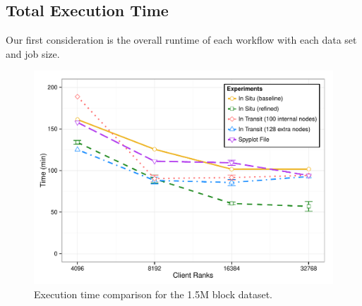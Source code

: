 

\subsection{Total Execution Time}
\label{sec:TotalExecutionTime}

Our first consideration is the overall runtime of each workflow with each
data set and job size.

\begin{figure}[tbp]
\begin{centering}
\includegraphics[scale=0.7]{figures/total-runtime-all}
\caption{Execution time comparison for the 1.5M block dataset.}
\label{fig:runtime-total}
\par\end{centering}
\end{figure}

